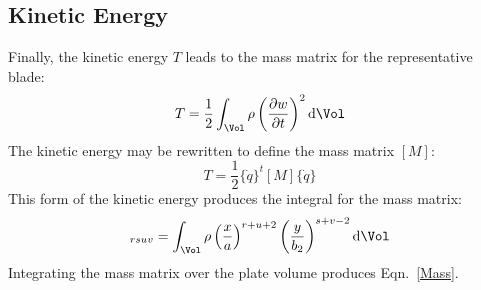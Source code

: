 \documentclass{article}
\begin{document}
\begin{body}
\begin{appendices}
{\subsection{Kinetic Energy}
Finally, the kinetic energy $T$ leads to the mass matrix for the representative blade:
\begin{equation}
T=\frac{1}{2} \int_{\Vol} \rho \left(\frac{\partial w}{\partial t}\right)^2 \text{d}\Vol
\end{equation}
The kinetic energy may be rewritten to define the mass matrix $[M]$:
\begin{equation}
T=\frac{1}{2}\{\dot{q}\}^t[M]\{\dot{q}\}
\end{equation}
This form of the kinetic energy produces the integral for the mass matrix:
\begin{equation}
[M]_{rsuv}=\int_{\Vol} \rho \left(\frac{x}{a}\right)^{r+u+2}\left(\frac{y}{b_2}\right)^{s+v-2} \text{d}\Vol
\end{equation}
Integrating the mass matrix over the plate volume produces Eqn.~\eqref{Mass}.

}
\end{appendices}
\end{body}
\end{document}
